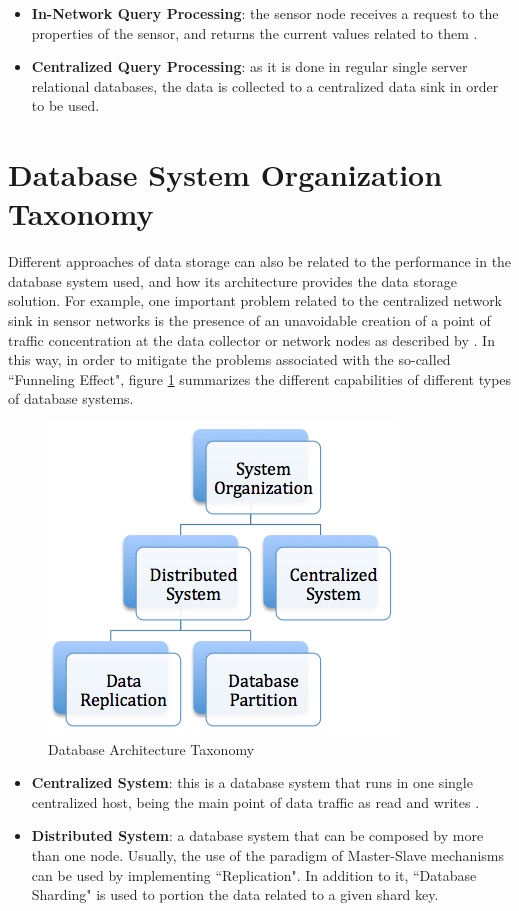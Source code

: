 \begin{itemize}
  \item \textbf{In-Network Query Processing}: the sensor node receives a
  request to the properties of the sensor, and returns the current values
  related to them \cite{sn-intro01}.
  \item \textbf{Centralized Query Processing}: as it is done in regular single
  server relational databases, the data is collected to a centralized data
  sink in order to be used.
\end{itemize}

\section{Database System Organization Taxonomy}

Different approaches of data storage can also be related to the performance in
the database system used, and how its architecture provides the data storage
solution. For example, one important problem related to the centralized
network sink in sensor networks is the presence of an unavoidable creation of a
point of traffic concentration at the data collector or network nodes as
described by \cite{sn-storage02}. In this way, in order to mitigate the
problems associated with the so-called ``Funneling Effect", figure
\ref{fig:taxonomy-database-architecture} summarizes the different capabilities
of different types of database systems.

\begin{figure}[h]
  \centering
  \includegraphics{../diagrams/taxonomy-database-architecture}
  \caption{Database Architecture Taxonomy}
  \label{fig:taxonomy-database-architecture}
\end{figure}

\begin{itemize}
  \item \textbf{Centralized System}: this is a database system that runs in
  one single centralized host, being the main point of data traffic as read
  and writes \cite{sn-intro01}.
  \item \textbf{Distributed System}: a database system that can be composed by
  more than one node. Usually, the use of the paradigm of Master-Slave
  mechanisms can be used by implementing ``Replication". In addition to it,
  ``Database Sharding" is used to portion the data related to a given shard
  key.
\end{itemize}